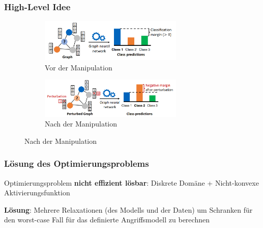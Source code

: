 \documentclass{beamer}
\begin{document}
\begin{frame}
  \frametitle{High-Level Idee}

  \begin{figure}[H]
    \centering
    \begin{subfigure}[b]{1\textwidth}
      \centering
      \includegraphics[width=0.75\textwidth]{img/before_pert.png}
      \caption*{Vor der Manipulation \cite{}}
    \end{subfigure}
    \begin{subfigure}[b]{1\textwidth}
      \centering
      \includegraphics[width=0.75\textwidth]{img/after_pert.png}
      \caption*{Nach der Manipulation \cite{}}
    \end{subfigure}
  \end{figure}
\end{frame}

\begin{frame}
  \frametitle{Lösung des Optimierungsproblems}
  Optimierungsproblem \textbf{nicht effizient lösbar}: Diskrete Domäne + Nicht-konvexe Aktivierungsfunktion\newline

  \textbf{Lösung}: Mehrere Relaxationen (des Modells und der Daten) um Schranken für den worst-case Fall für das definierte Angriffsmodell zu berechnen
\end{frame}
\end{document}
